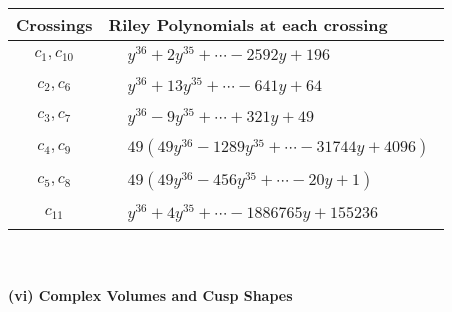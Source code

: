 \documentclass[1p]{elsarticle_modified}
\theoremstyle{definition}
\begin{document}
\begin{tabular}{m{50pt}|m{274pt}}
Crossings & \hspace{64pt}Riley Polynomials at each crossing \\
\hline $$\begin{aligned}c_{1},c_{10}\end{aligned}$$&$\begin{aligned}
&y^{36}+2 y^{35}+\cdots-2592 y+196
\end{aligned}$\\
\hline $$\begin{aligned}c_{2},c_{6}\end{aligned}$$&$\begin{aligned}
&y^{36}+13 y^{35}+\cdots-641 y+64
\end{aligned}$\\
\hline $$\begin{aligned}c_{3},c_{7}\end{aligned}$$&$\begin{aligned}
&y^{36}-9 y^{35}+\cdots+321 y+49
\end{aligned}$\\
\hline $$\begin{aligned}c_{4},c_{9}\end{aligned}$$&$\begin{aligned}
&49(49 y^{36}-1289 y^{35}+\cdots-31744 y+4096)
\end{aligned}$\\
\hline $$\begin{aligned}c_{5},c_{8}\end{aligned}$$&$\begin{aligned}
&49(49 y^{36}-456 y^{35}+\cdots-20 y+1)
\end{aligned}$\\
\hline $$\begin{aligned}c_{11}\end{aligned}$$&$\begin{aligned}
&y^{36}+4 y^{35}+\cdots-1886765 y+155236
\end{aligned}$\\
\hline
\end{tabular}\\~\\
\newpage\flushleft \textbf{(vi) Complex Volumes and Cusp Shapes}
\end{document}
